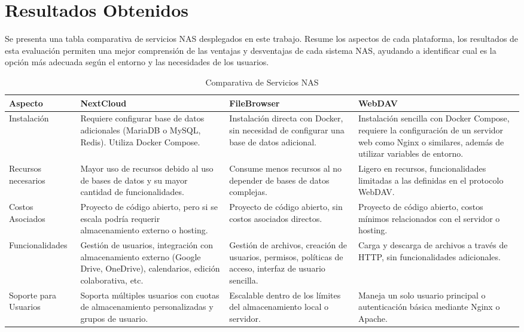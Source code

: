 \documentclass[a4paper,10pt]{article}
\begin{document}
	\section{Resultados Obtenidos}
	Se presenta una tabla comparativa de servicios NAS desplegados en este trabajo. Resume los aspectos de cada plataforma, los resultados de esta evaluación permiten una mejor comprensión de las ventajas y desventajas de cada sistema NAS, ayudando a identificar cual es la opción más adecuada según el entorno y las necesidades de los usuarios.
	\begin{table}[htbp]
		\centering
		\caption{Comparativa de Servicios NAS}
		\begin{tabularx}{\textwidth}{|X|X|X|X|}
			\hline
			\textbf{Aspecto} & \textbf{NextCloud} & \textbf{FileBrowser} & \textbf{WebDAV} \\
			\hline
			Instalación & Requiere configurar base de datos adicionales (MariaDB o MySQL, Redis). Utiliza Docker Compose. & Instalación directa con Docker, sin necesidad de configurar una base de datos adicional. & Instalación sencilla con Docker Compose, requiere la configuración de un servidor web como Nginx o similares, además de utilizar variables de entorno. \\
			\hline
			Recursos necesarios & Mayor uso de recursos debido al uso de bases de datos y su mayor cantidad de funcionalidades. & Consume menos recursos al no depender de bases de datos complejas. & Ligero en recursos, funcionalidades limitadas a las definidas en el protocolo WebDAV. \\
			\hline
			Costos Asociados & Proyecto de código abierto, pero si se escala podría requerir almacenamiento externo o hosting. & Proyecto de código abierto, sin costos asociados directos. & Proyecto de código abierto, costos mínimos relacionados con el servidor o hosting. \\
			\hline
			Funcionalidades & Gestión de usuarios, integración con almacenamiento externo (Google Drive, OneDrive), calendarios, edición colaborativa, etc. & Gestión de archivos, creación de usuarios, permisos, políticas de acceso, interfaz de usuario sencilla. & Carga y descarga de archivos a través de HTTP, sin funcionalidades adicionales. \\
			\hline
			Soporte para Usuarios & Soporta múltiples usuarios con cuotas de almacenamiento personalizadas y grupos de usuario. & Escalable dentro de los límites del almacenamiento local o servidor. & Maneja un solo usuario principal o autenticación básica mediante Nginx o Apache. \\

\end{tabularx}
\end{table}
\end{document}
